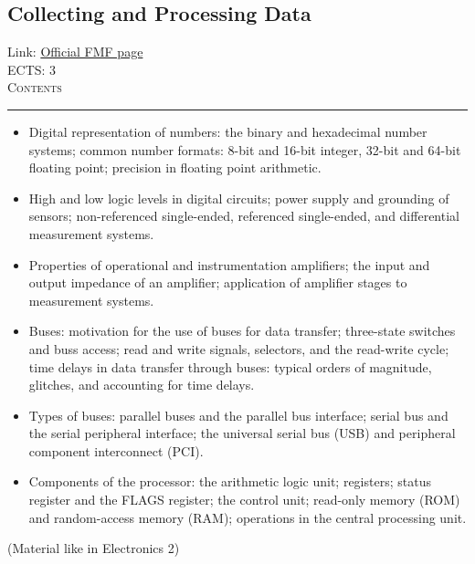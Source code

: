 \documentclass[11pt, a4paper]{article}
\newenvironment{course}[3]{
\subsection{#1}%
Link: \href{#2}{Official FMF page}\\%
ECTS: #3%
\vspace{1ex}
\\
{\large \textsc{Contents}}\\[-0.9ex]%
\rule{\textwidth}{0.5pt}
\vspace{-3ex}
}
{}
\newenvironment{chapter}[1]{
\begin{tcolorbox}[title=#1, breakable]
}
{\end{tcolorbox}}
\begin{document}
\begin{course}{Collecting and Processing Data}{https://www.fmf.uni-lj.si/en/study-physics/programmes/1fiz/2020/7000777/courses/1178/}{3}
    \label{collecting-and-processing-data}

    \begin{chapter}{Model of the processor}
        \begin{itemize}
        
            \item Digital representation of numbers: the binary and hexadecimal number systems; common number formats: 8-bit and 16-bit integer, 32-bit and 64-bit floating point; precision in floating point arithmetic.

            \item High and low logic levels in digital circuits; power supply and grounding of sensors;
            non-referenced single-ended, referenced single-ended, and differential measurement systems.

            \item Properties of operational and instrumentation amplifiers; the input and output impedance of an amplifier; application of amplifier stages to measurement systems.

            \item Buses: motivation for the use of buses for data transfer; three-state switches and buss access; read and write signals, selectors, and the read-write cycle; time delays in data transfer through buses: typical orders of magnitude, glitches, and accounting for time delays.

            \item Types of buses: parallel buses and the parallel bus interface; serial bus and the serial peripheral interface; the universal serial bus (USB) and peripheral component interconnect (PCI).

            \item Components of the processor: the arithmetic logic unit; registers; status register and the FLAGS register; the control unit; read-only memory (ROM) and random-access memory (RAM); operations in the central processing unit.

        \end{itemize}
    \end{chapter}

    \begin{chapter}{Analog-digital conversion}
        (Material like in Electronics 2)
        \begin{itemize}
        

\end{itemize}
\end{chapter}
\end{course}
\end{document}
